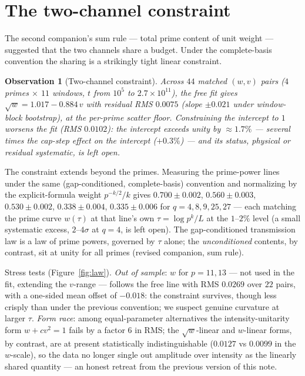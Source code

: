 \documentclass[12pt]{amsart}
\newtheorem{observation}{Observation}
\begin{document}
\section{The two-channel constraint}

The second companion's sum rule --- total prime content of unit weight
--- suggested that the two channels share a budget. Under the
complete-basis convention the sharing is a strikingly tight linear
constraint.

\begin{observation}[Two-channel constraint]
Across $44$ matched $(w, v)$ pairs ($4$ primes $\times$ $11$ windows,
$t$ from $10^5$ to $2.7\times10^{11}$), the free fit gives
$\sqrt{w} = 1.017 - 0.884\,v$ with residual RMS $0.0075$ (slope
$\pm 0.021$ under window-block bootstrap), at the per-prime scatter
floor. Constraining the intercept to $1$ worsens the fit (RMS $0.0102$):
the intercept exceeds unity by $\approx 1.7\%$ --- several times the
cap-step effect on the intercept ($+0.3\%$) --- and its status,
physical or residual systematic, is left open.
\end{observation}

The constraint extends beyond the primes. Measuring the prime-power
lines under the same (gap-conditioned, complete-basis) convention and
normalizing by the explicit-formula weight $p^{-k/2}/k$ gives
$0.700 \pm 0.002$, $0.560 \pm 0.003$, $0.530 \pm 0.002$,
$0.338 \pm 0.004$, $0.335 \pm 0.006$ for $q = 4, 8, 9, 25, 27$ ---
each matching the prime curve $w(\tau)$ at that line's own
$\tau = \log p^k / L$ at the $1$--$2\%$ level (a small systematic
excess, $2$--$4\sigma$ at $q = 4$, is left open). The gap-conditioned
transmission law is a law of prime powers, governed by $\tau$ alone;
the \emph{unconditioned} contents, by contrast, sit at unity for all
primes (revised companion, sum rule).

Stress tests (Figure~\ref{fig:law}). \emph{Out of sample}: $w$ for
$p = 11, 13$ --- not used in the fit, extending the $v$-range ---
follows the free line with RMS $0.0269$ over $22$ pairs, with a
one-sided mean offset of $-0.018$: the constraint survives, though less
crisply than under the previous convention; we suspect genuine curvature
at larger $\tau$. \emph{Form race}: among equal-parameter alternatives
the intensity-unitarity form $w + c v^2 = 1$ fails by a factor $6$ in
RMS; the $\sqrt{w}$-linear and $w$-linear forms, by contrast, are at
present statistically indistinguishable ($0.0127$ vs $0.0099$ in the
$w$-scale), so the data no longer single out amplitude over intensity as
the linearly shared quantity --- an honest retreat from the previous
version of this note.
\end{document}
